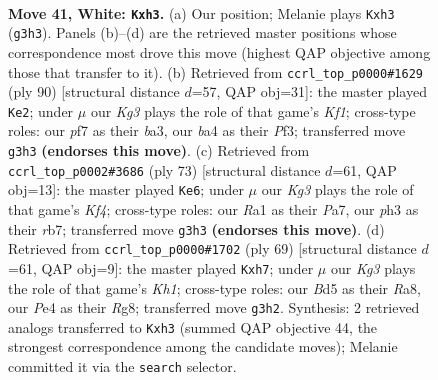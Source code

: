 \documentclass[11pt]{article}
\begin{document}
\clearpage

\begin{figure}[p]\centering
\begin{subfigure}{0.46\textwidth}\centering
\resizebox{\linewidth}{!}{%
\newchessgame
\chessboard[
  setfen={r7/pp3p2/6k1/3B3p/bP2P1r1/P5Kp/8/R4R2 w - - 8 41},
  showmover=false,
  pgfstyle=straightmove, color=movearrow, markmove={g3-h3}
]}
\caption{}
\end{subfigure}\hfill
\begin{subfigure}{0.46\textwidth}\centering
\resizebox{\linewidth}{!}{%
\newchessgame
\chessboard[
  setfen={5r2/8/3PRpk1/7p/3B4/b1R2Pp1/6P1/1r3K2 w - - 1 46},
  showmover=false,
  pgfstyle=straightmove, color=movearrow, markmove={f1-e2}
]}
\caption{}
\end{subfigure}
\\[4pt]
\begin{subfigure}{0.46\textwidth}\centering
\resizebox{\linewidth}{!}{%
\newchessgame
\chessboard[
  setfen={3r4/pR2b2p/8/2p1Pk2/1P6/P1R5/4KBPr/8 b - - 3 37},
  showmover=false,
  pgfstyle=straightmove, color=movearrow, markmove={f5-e6}
]}
\caption{}
\end{subfigure}\hfill
\begin{subfigure}{0.46\textwidth}\centering
\resizebox{\linewidth}{!}{%
\newchessgame
\chessboard[
  setfen={r5rk/7B/1pbp4/4p3/8/5P1P/PP4P1/R2R3K b - - 0 35},
  showmover=false,
  pgfstyle=straightmove, color=movearrow, markmove={h8-h7}
]}
\caption{}
\end{subfigure}
\caption{\textbf{Move 41, White: \texttt{Kxh3}.} (a) Our position; Melanie plays \texttt{Kxh3} (\texttt{g3h3}). Panels (b)--(d) are the retrieved master positions whose correspondence most drove this move (highest QAP objective among those that transfer to it). (b) Retrieved from \texttt{ccrl\_top\_p0000\#1629} (ply 90) [structural distance $d$=57, QAP obj=31]: the master played \texttt{Ke2}; under $\mu$ our \emph{Kg3} plays the role of that game's \emph{Kf1}; cross-type roles: our \emph{p}f7 as their \emph{b}a3, our \emph{b}a4 as their \emph{P}f3; transferred move \texttt{g3h3} \textbf{(endorses this move)}. (c) Retrieved from \texttt{ccrl\_top\_p0002\#3686} (ply 73) [structural distance $d$=61, QAP obj=13]: the master played \texttt{Ke6}; under $\mu$ our \emph{Kg3} plays the role of that game's \emph{Kf4}; cross-type roles: our \emph{R}a1 as their \emph{P}a7, our \emph{p}h3 as their \emph{r}b7; transferred move \texttt{g3h3} \textbf{(endorses this move)}. (d) Retrieved from \texttt{ccrl\_top\_p0000\#1702} (ply 69) [structural distance $d$=61, QAP obj=9]: the master played \texttt{Kxh7}; under $\mu$ our \emph{Kg3} plays the role of that game's \emph{Kh1}; cross-type roles: our \emph{B}d5 as their \emph{R}a8, our \emph{P}e4 as their \emph{R}g8; transferred move \texttt{g3h2}. Synthesis: 2 retrieved analogs transferred to \texttt{Kxh3} (summed QAP objective 44, the strongest correspondence among the candidate moves); Melanie committed it via the \texttt{search} selector.}
\label{fig:thought-m80}
\end{figure}
\end{document}
